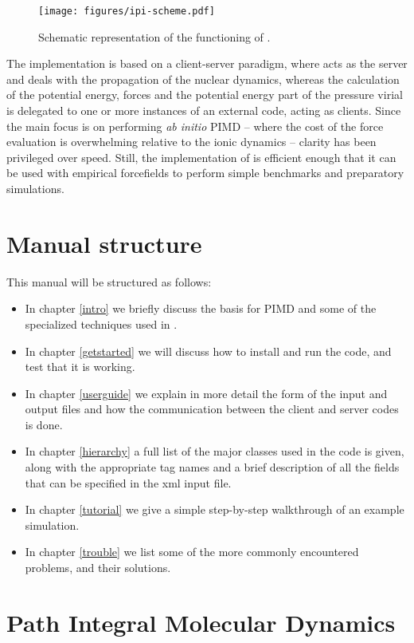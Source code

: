\documentclass[11pt,english,fleqn]{report}
\begin{document}
\begin{figure}[hb]
\centering\texttt{[image: figures/ipi-scheme.pdf]}
\caption{\label{fig:scheme} Schematic representation of the functioning of \ipi{}.} 
\end{figure}

The implementation is based on a client-server paradigm, where \ipi
acts as the server and deals with the propagation of the nuclear dynamics,
whereas the calculation of the potential energy, forces and the potential
energy part of the pressure virial is delegated to one or more instances
of an external code, acting as clients. Since the main focus is on
performing \emph{ab initio} PIMD -- where the cost of the force evaluation
is overwhelming relative to the ionic dynamics -- clarity has been
privileged over speed. Still, the implementation of \ipi is efficient
enough that it can be used with empirical forcefields to perform simple
benchmarks and preparatory simulations. 


\section{Manual structure}

This manual will be structured as follows: 
\begin{itemize}
\item In chapter \ref{intro} we briefly discuss the basis for PIMD and
some of the specialized techniques used in \ipi. 
\item In chapter \ref{getstarted} we will discuss how to install 
and run the code, and test that it is working.
\item In chapter \ref{userguide} we explain in more detail the form of the input
and output files and how the communication between the client and
server codes is done.
\item In chapter \ref{hierarchy} a full list of the major classes used
in the code is given, along with the appropriate tag names and a brief
description of all the fields that can be specified in the xml input
file.
\item In chapter \ref{tutorial} we give a simple step-by-step walkthrough of
an example \ipi simulation.
\item In chapter \ref{trouble} we list some of the more commonly encountered
problems, and their solutions.
\end{itemize}

\section{Path Integral Molecular Dynamics}
\end{document}
